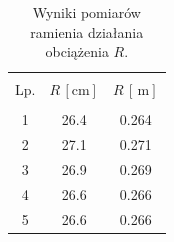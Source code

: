 \begin{table}[h]
\begin{center}
\renewcommand*{\tablename}{Tabela}
\caption{\small Wyniki pomiarów ramienia działania obciążenia $R$.\vspace{0.15cm}
    \label{tab:ramie_obciazenia}}
    {\small
    \begin{tabular}{c c c}
    \hline \vspace{-0.35cm} \\
      Lp. & $R\,[\mathrm{cm}]$ & $R\,[\, \mathrm{m}]$ \\ 
      \hline \vspace{-0.2cm} \\
     1 & 26.4 & 0.264 \\
     2 & 27.1 & 0.271 \\
     3 & 26.9 & 0.269 \\
     4 & 26.6 & 0.266 \\
     5 & 26.6 & 0.266 \\
    \hline
    \end{tabular}}
    \end{center}
\end{table}
